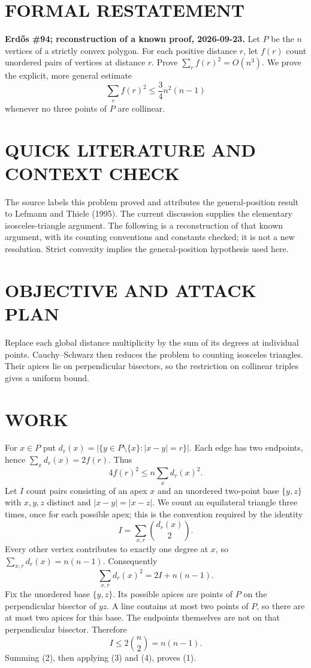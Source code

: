 \section{FORMAL RESTATEMENT}
\textbf{Erd\H{o}s \#94; reconstruction of a known proof, 2026-09-23.}
Let $P$ be the $n$ vertices of a strictly convex polygon. For each positive distance $r$, let $f(r)$ count unordered pairs of vertices at distance $r$. Prove $\sum_r f(r)^2=O(n^3)$. We prove the explicit, more general estimate
\[
\sum_r f(r)^2\leq\frac34n^2(n-1)
\tag{1}
\]
whenever no three points of $P$ are collinear.

\section{QUICK LITERATURE AND CONTEXT CHECK}
The source labels this problem proved and attributes the general-position result to Lefmann and Thiele (1995). The current discussion supplies the elementary isosceles-triangle argument. The following is a reconstruction of that known argument, with its counting conventions and constants checked; it is not a new resolution. Strict convexity implies the general-position hypothesis used here.

\section{OBJECTIVE AND ATTACK PLAN}
Replace each global distance multiplicity by the sum of its degrees at individual points. Cauchy--Schwarz then reduces the problem to counting isosceles triangles. Their apices lie on perpendicular bisectors, so the restriction on collinear triples gives a uniform bound.

\section{WORK}
For $x\in P$ put $d_r(x)=|\{y\in P\setminus\{x\}:|x-y|=r\}|$. Each edge has two endpoints, hence $\sum_xd_r(x)=2f(r)$. Thus
\[
4f(r)^2\leq n\sum_xd_r(x)^2.
\tag{2}
\]
Let $I$ count pairs consisting of an apex $x$ and an unordered two-point base $\{y,z\}$ with $x,y,z$ distinct and $|x-y|=|x-z|$. We count an equilateral triangle three times, once for each possible apex; this is the convention required by the identity
\[
I=\sum_{x,r}\binom{d_r(x)}2.
\]
Every other vertex contributes to exactly one degree at $x$, so $\sum_{x,r}d_r(x)=n(n-1)$. Consequently
\[
\sum_{x,r}d_r(x)^2=2I+n(n-1).
\tag{3}
\]
Fix the unordered base $\{y,z\}$. Its possible apices are points of $P$ on the perpendicular bisector of $yz$. A line contains at most two points of $P$, so there are at most two apices for this base. The endpoints themselves are not on that perpendicular bisector. Therefore
\[
I\leq2\binom n2=n(n-1).
\tag{4}
\]
Summing (2), then applying (3) and (4), proves (1).

